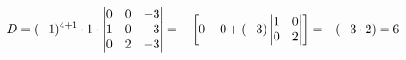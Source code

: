 \documentclass[preview]{standalone}
\begin{document}
\begin{align*}
\special{dvisvgm:raw <g id='unique000'>}D=(-1)^{4+1}\cdot 1\cdot\begin{vmatrix}0&0&-3\\1&0&-3\\0&2&-3\end{vmatrix}=-\left[0-0+(-3)\begin{vmatrix}1&0\\0&2\end{vmatrix}\right]=-(-3\cdot 2)=6\special{dvisvgm:raw </g>}
\end{align*}
\end{document}
